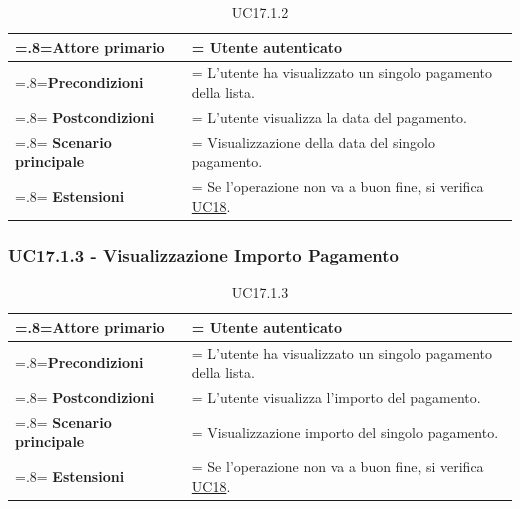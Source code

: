             \begin{table}[H]
                \centering
                \renewcommand{\arraystretch}{1.8}
                \renewcommand\tabularxcolumn[1]{m{#1}}
                \begin{tabularx}{0.9\textwidth} {
                    >{\hsize=.8\hsize\linewidth=\hsize}X
                    >{\hsize=1.2\hsize\linewidth=\hsize}X}
                    \hline
                    \textbf{Attore primario} & Utente autenticato \\
                    \hline
                    \textbf{Precondizioni} & L'utente ha visualizzato un singolo pagamento della lista. \\
                    \hline
                    \textbf{Postcondizioni} & L'utente visualizza la data del pagamento. \\
                    \hline
                    \textbf{Scenario principale} & Visualizzazione della data del singolo pagamento. \\
                    \hline
                    \textbf{Estensioni} & Se l'operazione non va a buon fine, si verifica \hyperref[UC18]{UC18}. \\
                    \hline
                \end{tabularx}
                \caption{UC17.1.2}
            \end{table}

        \subsubsection{UC17.1.3 - Visualizzazione Importo Pagamento}
        \label{UC17.1.3}

            \begin{table}[H]
                \centering
                \renewcommand{\arraystretch}{1.8}
                \renewcommand\tabularxcolumn[1]{m{#1}}
                \begin{tabularx}{0.9\textwidth} {
                    >{\hsize=.8\hsize\linewidth=\hsize}X
                    >{\hsize=1.2\hsize\linewidth=\hsize}X}
                    \hline
                    \textbf{Attore primario} & Utente autenticato \\
                    \hline
                    \textbf{Precondizioni} & L'utente ha visualizzato un singolo pagamento della lista. \\
                    \hline
                    \textbf{Postcondizioni} & L'utente visualizza l'importo del pagamento. \\
                    \hline
                    \textbf{Scenario principale} & Visualizzazione importo del singolo pagamento. \\
                    \hline
                    \textbf{Estensioni} & Se l'operazione non va a buon fine, si verifica \hyperref[UC18]{UC18}. \\
                    \hline
                \end{tabularx}
                \caption{UC17.1.3}
            \end{table}
        
